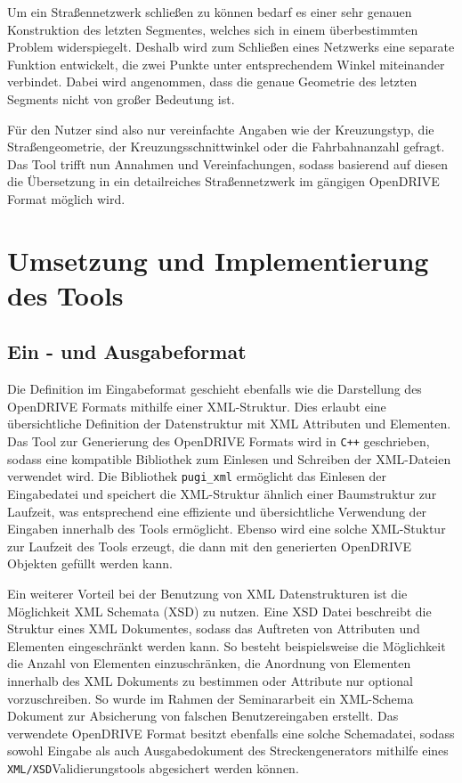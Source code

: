Um ein Straßennetzwerk schließen zu können bedarf es einer sehr genauen Konstruktion des letzten Segmentes, welches sich in einem überbestimmten Problem widerspiegelt. Deshalb wird zum Schließen eines Netzwerks eine separate Funktion entwickelt, die zwei Punkte unter entsprechendem Winkel miteinander verbindet. Dabei wird angenommen, dass die genaue Geometrie des letzten Segments nicht von großer Bedeutung ist.

Für den Nutzer sind also nur vereinfachte Angaben wie der Kreuzungstyp, die Straßengeometrie, der Kreuzungsschnittwinkel oder die Fahrbahnanzahl gefragt. Das Tool trifft nun Annahmen und Vereinfachungen, sodass basierend auf diesen die Übersetzung in ein detailreiches Straßennetzwerk im gängigen OpenDRIVE Format möglich wird.

\chapter{Umsetzung und Implementierung des Tools}

\section{Ein - und Ausgabeformat}
Die Definition im Eingabeformat geschieht ebenfalls wie die Darstellung des OpenDRIVE Formats mithilfe einer XML-Struktur. Dies erlaubt eine übersichtliche Definition der Datenstruktur mit XML Attributen und Elementen. Das Tool zur Generierung des OpenDRIVE Formats wird in \texttt{C++} geschrieben, sodass eine kompatible Bibliothek zum Einlesen und Schreiben der XML-Dateien verwendet wird. Die Bibliothek \texttt{pugi\_xml} ermöglicht das Einlesen der Eingabedatei und speichert die XML-Struktur ähnlich einer Baumstruktur zur Laufzeit, was entsprechend eine effiziente und übersichtliche Verwendung der Eingaben innerhalb des Tools ermöglicht. Ebenso wird eine solche XML-Stuktur zur Laufzeit des Tools erzeugt, die dann mit den generierten OpenDRIVE Objekten gefüllt werden kann.

Ein weiterer Vorteil bei der Benutzung von XML Datenstrukturen ist die Möglichkeit XML Schemata (XSD) zu nutzen. Eine XSD Datei beschreibt die Struktur eines XML Dokumentes, sodass das Auftreten von Attributen und Elementen eingeschränkt werden kann. So besteht beispielsweise die Möglichkeit die Anzahl von Elementen einzuschränken, die Anordnung von Elementen innerhalb des XML Dokuments zu bestimmen oder Attribute nur optional vorzuschreiben. So wurde im Rahmen der Seminararbeit ein XML-Schema Dokument zur Absicherung von falschen Benutzereingaben erstellt. Das verwendete OpenDRIVE Format besitzt ebenfalls eine solche Schemadatei, sodass sowohl Eingabe als auch Ausgabedokument des Streckengenerators mithilfe eines \texttt{XML/XSD}Validierungstools abgesichert werden können.


